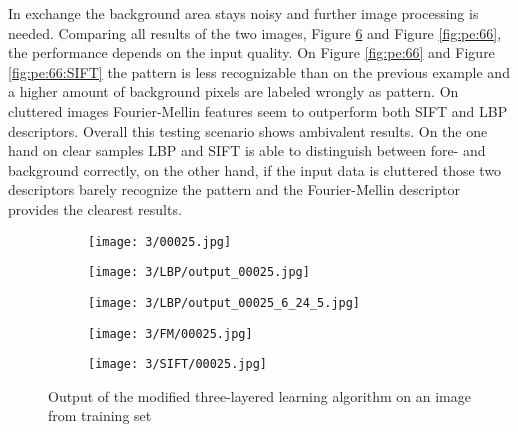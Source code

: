 \documentclass[draft,final]{vutinfth} %
\begin{document}
In exchange the background area stays noisy and further image processing is needed.
Comparing all results of the two images, Figure \ref{fig:pe:25} and Figure \ref{fig:pe:66}, the performance depends on the input quality.
On Figure \ref{fig:pe:66} and Figure \ref{fig:pe:66:SIFT} the pattern is less recognizable than on the previous example and a higher amount of background pixels are labeled wrongly as pattern.
On cluttered images Fourier-Mellin features seem to outperform both SIFT and LBP descriptors.
Overall this testing scenario shows ambivalent results.
On the one hand on clear samples LBP and SIFT is able to distinguish between fore- and background correctly, on the other hand, if the input data is cluttered those two descriptors barely recognize the pattern and the Fourier-Mellin descriptor provides the clearest results. 

\begin{figure}[h]
  \centering
  \begin{subfigure}[t]{0.19\columnwidth}
    \centering
    \texttt{[image: 3/00025.jpg]}
    \label{fig:pe:25:orig}
  \end{subfigure}
  \begin{subfigure}[t]{0.19\columnwidth}
    \centering
    \texttt{[image: 3/LBP/output\_00025.jpg]}
    \label{fig:pe:25:LBPs}
  \end{subfigure}
  \begin{subfigure}[t]{0.19\columnwidth}
    \centering
    \texttt{[image: 3/LBP/output\_00025\_6\_24\_5.jpg]}
    \label{fig:pe:25:LBPb}
  \end{subfigure}
  \begin{subfigure}[t]{0.19\columnwidth}
    \centering
    \texttt{[image: 3/FM/00025.jpg]}
    \label{fig:pe:25:FM}
  \end{subfigure}
  \begin{subfigure}[t]{0.19\columnwidth}
    \centering
    \texttt{[image: 3/SIFT/00025.jpg]}
    \label{fig:pe:25:SIFT}
  \end{subfigure}
  \caption{Output of the modified three-layered learning algorithm on an image from training set}
  \label{fig:pe:25}
\end{figure}
\end{document}
